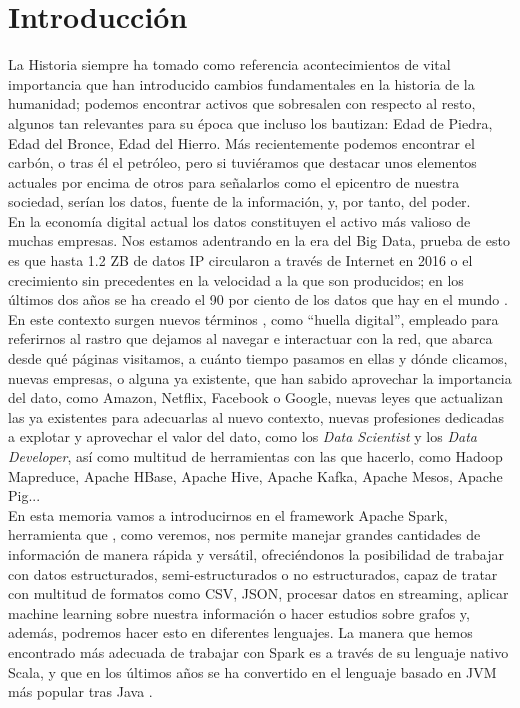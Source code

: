\chapter{Introducción}

La Historia siempre ha tomado como referencia acontecimientos de vital importancia que han introducido cambios fundamentales en la historia de la humanidad;  podemos encontrar activos que sobresalen con respecto al resto, algunos tan relevantes para su época que incluso los bautizan: Edad de Piedra, Edad del Bronce, Edad del Hierro. Más recientemente podemos encontrar el carbón, o tras él el petróleo, pero si tuviéramos que destacar  unos elementos actuales por encima de otros para señalarlos como el epicentro de nuestra sociedad, serían los datos, fuente de la información, y, por tanto, del poder.\\

En la economía digital actual los datos constituyen el activo más valioso de muchas empresas. Nos estamos adentrando en la era del Big Data, prueba de esto es que hasta 1.2 ZB de datos IP circularon a través de Internet en 2016 \cite{0cisco} o el crecimiento sin precedentes en la velocidad a la que son producidos; en los últimos dos años se ha creado el 90 por ciento de los datos que hay en el mundo \cite{0IBM}. \\

En este contexto surgen nuevos términos , como “huella digital”, empleado para referirnos al rastro que dejamos al navegar e interactuar con la red, que abarca desde qué páginas visitamos, a cuánto tiempo pasamos en ellas y dónde clicamos, nuevas empresas, o alguna ya existente, que han sabido aprovechar la importancia del dato, como Amazon, Netflix, Facebook o Google, nuevas leyes \cite{0RGPD} que actualizan las ya existentes para adecuarlas al nuevo contexto, nuevas profesiones dedicadas a explotar y aprovechar el valor del dato, como los \textit{Data Scientist} y los \textit{Data Developer}, así como multitud de herramientas con las que hacerlo, como Hadoop Mapreduce, Apache HBase, Apache Hive, Apache Kafka, Apache Mesos, Apache Pig... \\

En esta memoria vamos a introducirnos en el framework Apache Spark, herramienta que , como veremos, nos permite manejar grandes cantidades de información de manera rápida y versátil, ofreciéndonos la posibilidad de trabajar con datos estructurados, semi-estructurados o no estructurados, capaz de tratar con multitud de formatos como CSV, JSON, procesar datos en streaming, aplicar machine learning sobre nuestra información o hacer estudios sobre grafos y, además, podremos hacer esto en diferentes lenguajes. La manera que hemos encontrado más adecuada de trabajar con Spark es a través de su lenguaje nativo Scala, y que en los últimos años se ha convertido en el lenguaje basado en JVM más popular tras Java \cite{0PYPL}. \\

